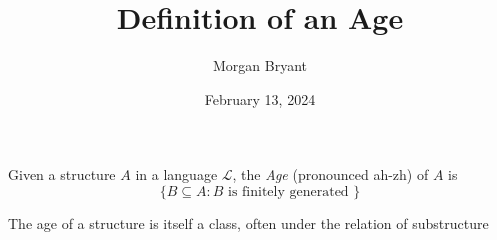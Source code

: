 \documentclass[a4paper]{article}
\title{Definition of an Age}
\date{February 13, 2024}
\author{Morgan Bryant}
\begin{document}
\maketitle
\par{Given a structure \(A\) in a language \(\mathcal {L}\), the \emph{Age} (pronounced ah-zh) of \(A\) is \[\{ B \subseteq  A: B  \text { is finitely generated } \}\]}\par{The age of a structure is itself a class, often under the relation of substructure}
\printbibliography
\end{document}
